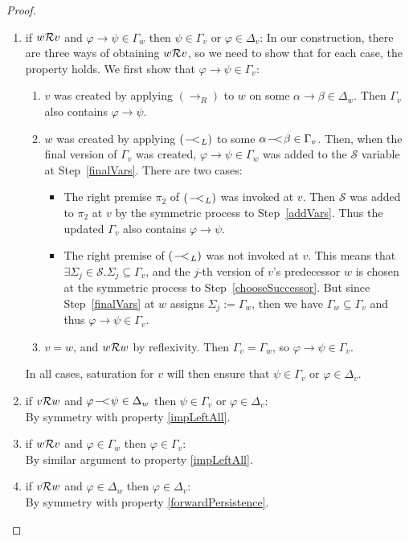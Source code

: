 \documentclass{llncs}
\numberwithin{equation}{section}
\newcommand{\Succ}{{\mathcal{S}}}
\newcommand{\ExImp}{\rightarrow}
\newcommand{\Imp}{\rightarrow}
\newcommand{\WeakImp}{
\begin{picture}(10,10)
     \put(1,0){$-$}
     \put(7,0){$<$}
   \end{picture}
   \;\; 
}
\newcommand{\mycal}[1]{
        {\cal{#1}}
}
\newcommand{\ImpRightRule}{({\Imp_R})}
\newcommand{\WeakImpLeftRule}{({\WeakImp_L})}
\begin{document}
\begin{proof}
\begin{enumerate}
		\item\label{impLeftAll} if $w
                  \mycal{R} v$ and $\varphi \ExImp \psi \in \Gamma_w$
                  then $\psi \in \Gamma_{v}$ or $\varphi \in
                  \Delta_{v}$: In our construction, there are three
                  ways of obtaining $w \mycal{R} v$, so we need to
                  show that for each case, the property holds. We
                  first show that $\varphi \ExImp \psi \in \Gamma_v$:
                        \begin{enumerate}
                                \item $v$ was created by applying $\ImpRightRule$ to $w$ on some $\alpha \ExImp \beta \in \Delta_{w}$. Then $\Gamma_v$ also contains $\varphi \ExImp \psi$.
                                \item $w$ was created by applying $\WeakImpLeftRule$ to some $\alpha \WeakImp \beta \in \Gamma_v$. Then, when the final version of $\Gamma_v$ was created, $\varphi \ExImp \psi \in \Gamma_w$ was added to the $\Succ$ variable at Step~\ref{finalVars}. There are two cases:
                                \begin{itemize}
                                        \item The right premise $\pi_2$ of $\WeakImpLeftRule$ was invoked at $v$. Then $\Succ$ was added to $\pi_2$ at $v$ by the symmetric process to Step~\ref{addVars}. Thus the updated $\Gamma_v$ also contains $\varphi \ExImp \psi$.
                                        \item The right premise of $\WeakImpLeftRule$ was not invoked at $v$. This means that $\exists \Sigma_j \in \Succ . \Sigma_j \subseteq \Gamma_v$, and the $j$-th version of $v$'s predecessor $w$ is chosen at the symmetric process to Step~\ref{chooseSuccessor}. But since Step~\ref{finalVars} at $w$ assigns $\Sigma_j  := \Gamma_w $, then we have $\Gamma_w \subseteq \Gamma_v$ and thus $\varphi \ExImp \psi \in \Gamma_v$.
                                \end{itemize}
                                \item $v = w$, and $w \mycal{R} w$ by reflexivity. Then $\Gamma_v = \Gamma_w$, so $\varphi \ExImp \psi \in \Gamma_v$.
                        \end{enumerate}         
                        In all cases, saturation for $v$ will then ensure that $\psi \in \Gamma_{v}$ or $\varphi \in \Delta_{v}$.
		\item if $v \mycal{R} w$ and $\varphi \WeakImp \psi \in \Delta_w$ then $\psi \in \Gamma_{v}$ or $\varphi \in \Delta_{v}$: \\
			By symmetry with property \ref{impLeftAll}.
		\item\label{forwardPersistence} if $w \mycal{R} v$ and $\varphi \in \Gamma_w$ then $\varphi \in \Gamma_{v}$: \\
			By similar argument to property \ref{impLeftAll}.
		\item if $v \mycal{R} w$ and $\varphi \in \Delta_w$ then $\varphi \in \Delta_{v}$:	\\	
			By symmetry with property \ref{forwardPersistence}.
	\end{enumerate}


\end{proof}
\end{document}

